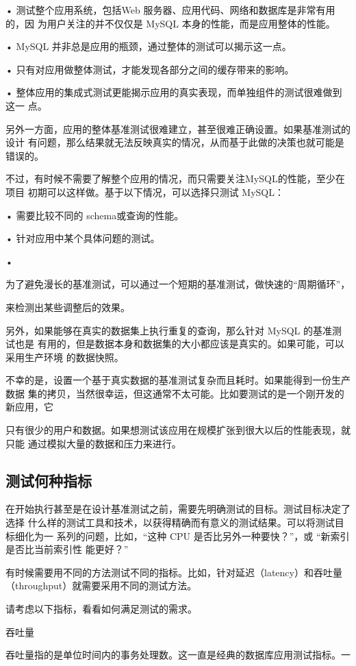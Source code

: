 • 测试整个应用系统，包括Web 服务器、应用代码、网络和数据库是非常有用的，因
为用户关注的并不仅仅是 MySQL 本身的性能，而是应用整体的性能。

• MySQL 并非总是应用的瓶颈，通过整体的测试可以揭示这一点。

• 只有对应用做整体测试，才能发现各部分之间的缓存带来的影响。

• 整体应用的集成式测试更能揭示应用的真实表现，而单独组件的测试很难做到这一
点。

另外一方面，应用的整体基准测试很难建立，甚至很难正确设置。如果基准测试的设计
有问题，那么结果就无法反映真实的情况，从而基于此做的决策也就可能是错误的。

不过，有时候不需要了解整个应用的情况，而只需要关注MySQL的性能，至少在项目
初期可以这样做。基于以下情况，可以选择只测试 MySQL：

• 需要比较不同的 schema或查询的性能。

• 针对应用中某个具体问题的测试。

•

为了避免漫长的基准测试，可以通过一个短期的基准测试，做快速的“周期循环”，

来检测出某些调整后的效果。

另外，如果能够在真实的数据集上执行重复的查询，那么针对 MySQL 的基准测试也是
有用的，但是数据本身和数据集的大小都应该是真实的。如果可能，可以采用生产环境
的数据快照。

不幸的是，设置一个基于真实数据的基准测试复杂而且耗时。如果能得到一份生产数据
集的拷贝，当然很幸运，但这通常不太可能。比如要测试的是一个刚开发的新应用，它
~

只有很少的用户和数据。如果想测试该应用在规模扩张到很大以后的性能表现，就只能
通过模拟大量的数据和压力来进行。

\subsection{测试何种指标}
在开始执行甚至是在设计基准测试之前，需要先明确测试的目标。测试目标决定了选择
什么样的测试工具和技术，以获得精确而有意义的测试结果。可以将测试目标细化为一
系列的问题，比如，“这种 CPU 是否比另外一种要快？”，或 “新索引是否比当前索引性
能更好？”

有时候需要用不同的方法测试不同的指标。比如，针对延迟（latency）和吞吐量
（throughput）就需要采用不同的测试方法。

请考虑以下指标，看看如何满足测试的需求。

吞吐量

吞吐量指的是单位时间内的事务处理数。这一直是经典的数据库应用测试指标。一

